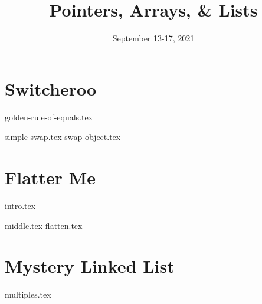 \documentclass[11pt]{exam}
\title{Pointers, Arrays, \& Lists}
\date{September 13-17, 2021}
\begin{document}
\maketitle

\section{Switcheroo}
{golden-rule-of-equals.tex}
\begin{questions}
{simple-swap.tex}
{swap-object.tex}
\end{questions}


\clearpage

\section{Flatter Me}
{intro.tex}
\begin{questions}
{middle.tex}
{flatten.tex}
\end{questions}

\clearpage

\section{Mystery Linked List}
\begin{questions}
{multiples.tex}
\end{questions}


\clearpage
\end{document}
